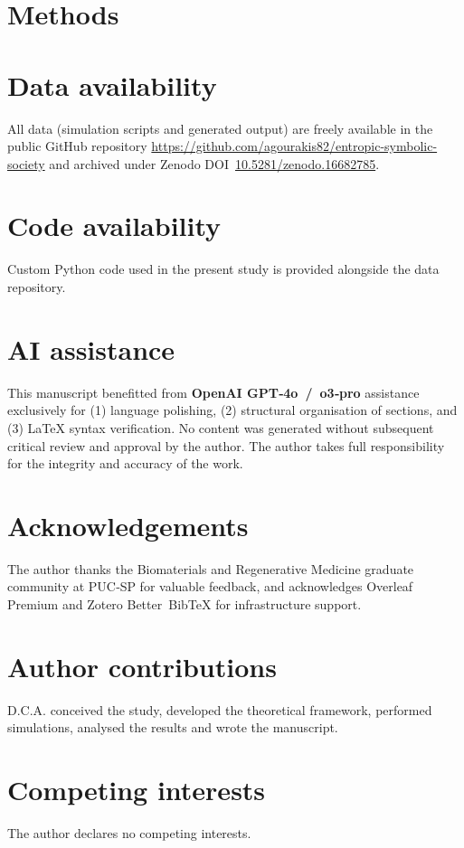 \documentclass{nature}             %
\begin{document}
\section*{Methods}


\section*{Data availability}
All data (simulation scripts and generated output) are freely available in the public GitHub repository \url{https://github.com/agourakis82/entropic-symbolic-society} and archived under Zenodo DOI \href{https://doi.org/10.5281/zenodo.16682785}{10.5281/zenodo.16682785}.

\section*{Code availability}
Custom Python code used in the present study is provided alongside the data repository.

\section*{AI assistance}
This manuscript benefitted from \textbf{OpenAI GPT‑4o / o3‑pro} assistance exclusively for
(1) language polishing, 
(2) structural organisation of sections, and 
(3) LaTeX syntax verification. 
No content was generated without subsequent critical review and approval by the author.
The author takes full responsibility for the integrity and accuracy of the work.

\section*{Acknowledgements}
The author thanks the Biomaterials and Regenerative Medicine graduate community at PUC‑SP for valuable feedback, and acknowledges Overleaf Premium and Zotero Better BibTeX for infrastructure support.

\section*{Author contributions}
D.C.A. conceived the study, developed the theoretical framework, performed simulations, analysed the results and wrote the manuscript.

\section*{Competing interests}
The author declares no competing interests.



\end{document}
